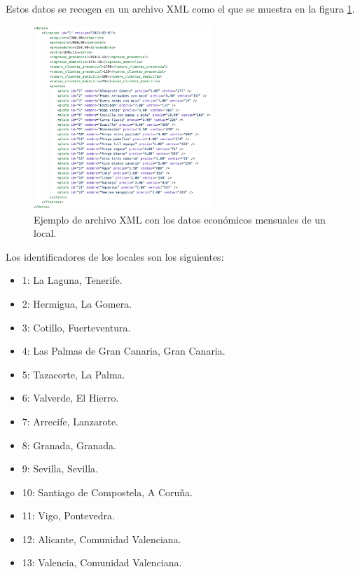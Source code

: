 \documentclass[11pt]{opticajnl}
\begin{document}
Estos datos se recogen en un archivo XML como el que se muestra en la figura \ref{fig:xml_economico}.

\begin{figure}[h]
\centering
\includegraphics[width=0.6\textwidth]{fotos/1.png}
\caption{Ejemplo de archivo XML con los datos económicos mensuales de un local.}
\label{fig:xml_economico}
\end{figure}

\noindent Los identificadores de los locales son los siguientes:
\begin{multicols}{2}
\begin{itemize}
\item 1: La Laguna, Tenerife.
\item 2: Hermigua, La Gomera.
\item 3: Cotillo, Fuerteventura.
\item 4: Las Palmas de Gran Canaria, Gran Canaria.
\item 5: Tazacorte, La Palma.
\item 6: Valverde, El Hierro.
\item 7: Arrecife, Lanzarote.
\item 8: Granada, Granada.
\item 9: Sevilla, Sevilla.
\item 10: Santiago de Compostela, A Coruña.
\item 11: Vigo, Pontevedra.
\item 12: Alicante, Comunidad Valenciana.
\item 13: Valencia, Comunidad Valenciana. 
\end{itemize}
\end{multicols}
\end{document}

